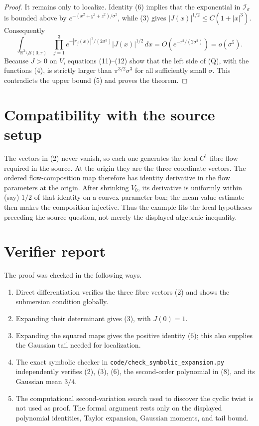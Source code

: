 \documentclass[11pt]{article}
\newcommand{\R}{\mathbb R}
\newcommand{\I}{\mathcal I}
\begin{document}
\begin{proof}
It remains only to localize.  Identity \textup{(6)} implies that the
exponential in $\I_\sigma$ is bounded above by
$e^{-(x^2+y^2+z^2)/\sigma^2}$, while \textup{(3)} gives
$|J(x)|^{1/2}\leq C(1+|x|^3)$.  Consequently
\begin{equation}
 \int_{\R^3\setminus B(0,r)}
 \prod_{j=1}^3e^{-|\pi_j(x)|^2/(2\sigma^2)}|J(x)|^{1/2}\,dx
 =O(e^{-r^2/(2\sigma^2)})=o(\sigma^5).
\end{equation}
Because $J>0$ on $V$, equations \textup{(11)}--\textup{(12)} show that the
left side of \textup{(Q)}, with the functions \textup{(4)}, is strictly
larger than $\pi^{3/2}\sigma^3$ for all sufficiently small $\sigma$.  This
contradicts the upper bound \textup{(5)} and proves the theorem.
\end{proof}

\section{Compatibility with the source setup}
The vectors in \textup{(2)} never vanish, so each one generates the local
$C^1$ fibre flow required in the source.  At the origin they are the three
coordinate vectors.  The ordered flow-composition map therefore has identity
derivative in the flow parameters at the origin.  After shrinking $V_0$, its
derivative is uniformly within (say) $1/2$ of that identity on a convex
parameter box; the mean-value estimate then makes the composition injective.
Thus the example fits the local hypotheses preceding the source question,
not merely the displayed algebraic inequality.

\section{Verifier report}
The proof was checked in the following ways.
\begin{enumerate}[leftmargin=*]
\item Direct differentiation verifies the three fibre vectors \textup{(2)}
and shows the submersion condition globally.
\item Expanding their determinant gives \textup{(3)}, with $J(0)=1$.
\item Expanding the squared maps gives the positive identity \textup{(6)};
this also supplies the Gaussian tail needed for localization.
\item The exact symbolic checker in
\texttt{code/check\_symbolic\_expansion.py} independently verifies
\textup{(2)}, \textup{(3)}, \textup{(6)}, the second-order polynomial in
\textup{(8)}, and its Gaussian mean $3/4$.
\item The computational second-variation search used to discover the cyclic
twist is not used as proof.  The formal argument rests only on the displayed
polynomial identities, Taylor expansion, Gaussian moments, and tail bound.
\end{enumerate}
\end{document}
